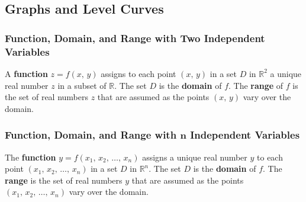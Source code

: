 \subsection{Graphs and Level Curves}
\subsubsection{Function, Domain, and Range with Two Independent Variables}
A \textbf{function} $z = f(x,\, y)$ assigns to each point $(x,\, y)$ in a set $D$ in $\mathbb{R}^2$ a unique real number $z$ in a subset of $\mathbb{R}$. The set $D$ is the \textbf{domain} of $f$. The \textbf{range} of $f$ is the set of real numbers $z$ that are assumed as the points $(x,\, y)$ vary over the domain.

\subsubsection{Function, Domain, and Range with $\mathbf{n}$ Independent Variables}
The \textbf{function} $y = f(x_1,\, x_2,\, \ldots,\, x_n)$ assigns a unique real number $y$ to each point $(x_1,\, x_2,\, \ldots,\, x_n)$ in a set $D$ in $\mathbb{R}^n$. The set $D$ is the \textbf{domain} of $f$. The \textbf{range} is the set of real numbers $y$ that are assumed as the points $(x_1,\, x_2,\, \ldots,\, x_n)$ vary over the domain.
